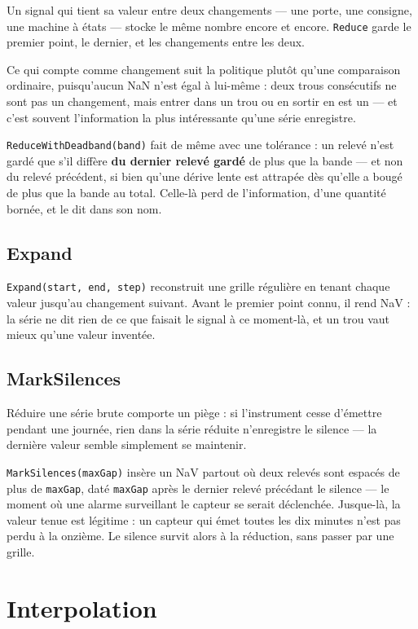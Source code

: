 \documentclass[11pt,a4paper]{report}
\begin{document}
Un signal qui tient sa valeur entre deux changements --- une porte, une
consigne, une machine à états --- stocke le même nombre encore et
encore. \texttt{Reduce} garde le premier point, le dernier, et les
changements entre les deux.

Ce qui compte comme changement suit la politique plutôt qu'une
comparaison ordinaire, puisqu'aucun NaN n'est égal à lui-même : deux
trous consécutifs ne sont pas un changement, mais entrer dans un trou ou
en sortir en est un --- et c'est souvent l'information la plus
intéressante qu'une série enregistre.

\texttt{ReduceWithDeadband(band)} fait de même avec une tolérance : un
relevé n'est gardé que s'il diffère \textbf{du dernier relevé gardé} de
plus que la bande --- et non du relevé précédent, si bien qu'une dérive
lente est attrapée dès qu'elle a bougé de plus que la bande au total.
Celle-là perd de l'information, d'une quantité bornée, et le dit dans
son nom.

\section{Expand}

\texttt{Expand(start,\ end,\ step)} reconstruit une grille régulière en
tenant chaque valeur jusqu'au changement suivant. Avant le premier point
connu, il rend NaV : la série ne dit rien de ce que faisait le signal à
ce moment-là, et un trou vaut mieux qu'une valeur inventée.

\section{MarkSilences}

Réduire une série brute comporte un piège : si l'instrument cesse
d'émettre pendant une journée, rien dans la série réduite n'enregistre
le silence --- la dernière valeur semble simplement se maintenir.

\texttt{MarkSilences(maxGap)} insère un NaV partout où deux relevés sont
espacés de plus de \texttt{maxGap}, daté \texttt{maxGap} après le
dernier relevé précédant le silence --- le moment où une alarme
surveillant le capteur se serait déclenchée. Jusque-là, la valeur tenue
est légitime : un capteur qui émet toutes les dix minutes n'est pas
perdu à la onzième. Le silence survit alors à la réduction, sans passer
par une grille.

\chapter{Interpolation}\label{chap:interpolation}
\end{document}
